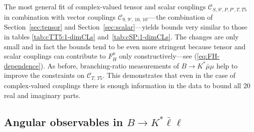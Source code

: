 \documentclass[twocolumn,epjc3]{svjour3}
\numberwithin{equation}{section}
\def \refeq#1{(\ref{#1})}
\def \refsec#1{Section~\ref{#1}}
\newcommand{\wilson}[2][{}]{\mathcal{C}_{#2}^{\mathrm{#1}}}
\renewcommand{\[}{\big[}
\renewcommand{\]}{\big]}
\renewcommand{\(}{\big(}
\renewcommand{\)}{\big)}
\begin{document}
The most general fit of complex-valued tensor and scalar couplings
$\wilson{S,S',P,P',T,T5}$ in combination with vector couplings
$\wilson{9,\,9',\,10,\, 10'}$---the combination of \refsec{sec:tensor} and
\refsec{sec:scalar}---yields bounds very similar to those in tables
\ref{tab:cTT5:1-dimCLs} and~\ref{tab:cSP:1-dimCLs}. The changes are only small
and in fact the bounds tend to be even more stringent because tensor and scalar
couplings can contribute to $F_H^{\mu}$ only constructively---see
\refeq{eq:FH-dependence}.  As before, branching-ratio measurements of $B\to
K^{*}\bar\mu\mu$ help to improve the constraints on $\wilson{T,\, T5}$. This
demonstrates that even in the case of complex-valued couplings there is enough
information in the data to bound all 20 real and imaginary parts.

%
%
\subsection{Angular observables in $B\to K^* \bar\ell\ell$}
\end{document}
